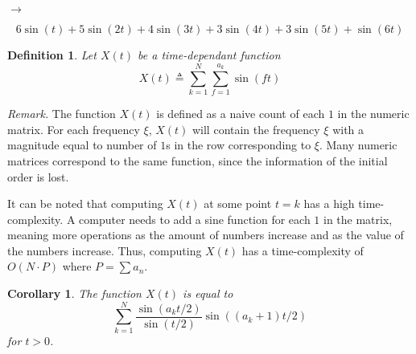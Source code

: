 \documentclass{article}
\newtheorem{definition}{Definition}[section]
\newtheorem{corollary}{Corollary}[section]
\begin{document}
\begin{minipage}{0.3\textwidth}
    \begin{flushright}        
    \end{flushright}
\end{minipage}
\hspace{0.5cm}\(\longrightarrow\)\hspace{0.5cm}
\begin{minipage}{0.5\textwidth}
    \[
        6\sin(t) + 5\sin(2t) + 4\sin(3t) + 3\sin(4t)+3\sin(5t)+\sin(6t)
    \]
\end{minipage}

\begin{definition}
    Let \(X(t)\) be a time-dependant function
    \[
        X(t) \triangleq
        \sum_{k=1}^{N}
        \sum_{f=1}^{a_k}
        \sin(ft)
    \]
\end{definition}

\textit{Remark.} The function \(X(t)\) is defined as a naive count of each \(1\) in the numeric matrix.
For each frequency \(\xi\), \(X(t)\) will contain the frequency \(\xi\) with a magnitude equal to
number of \(1\)s in the row corresponding to \(\xi\).
Many numeric matrices correspond to the same function, since the information of the initial order is lost.

It can be noted that computing \(X(t)\) at some point \(t=k\) has a high time-complexity.
A computer needs to add a sine function for each \(1\) in the matrix, meaning
more operations as the amount of numbers increase and as the value of the numbers increase.
Thus, computing \(X(t)\) has a time-complexity of \(O(N \cdot P)\) where
\(P=\sum a_n\).

\begin{corollary}
    The function \(X(t)\) is equal to
    \[
        \sum_{k=1}^{N} \frac{\sin(a_k t/2)}{\sin(t/2)} \sin((a_k+1)t/2)
    \]
    for \(t > 0\). %
\end{corollary}
\end{document}
